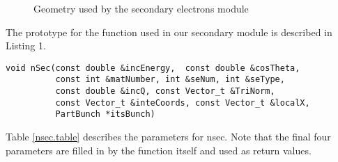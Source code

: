 \documentclass[a4paper,11pt]{article}
\begin{document}
\begin{figure}[H]
\centering

\caption{Geometry used by the secondary electrons module}
\label{incident electrons}
\end{figure}


The prototype for the function used in our secondary module is described in Listing 1. 


\begin{verbatim}
void nSec(const double &incEnergy,  const double &cosTheta, 
          const int &matNumber, int &seNum, int &seType, 
          const double &incQ, const Vector_t &TriNorm, 
          const Vector_t &inteCoords, const Vector_t &localX, 
          PartBunch *itsBunch) 
\end{verbatim}

Table \ref{nsec.table} describes the parameters for nsec.
Note that the final four parameters are filled in by the function itself
and used as return values.
\end{document}
